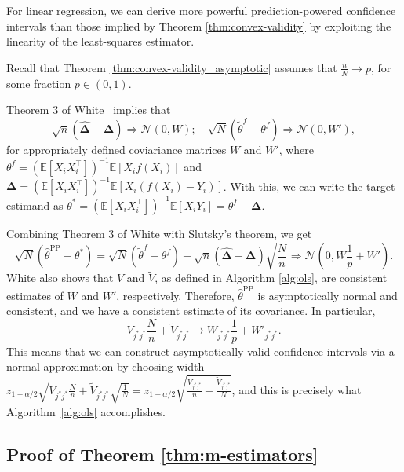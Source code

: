 \documentclass[10pt]{article}
\def\E{\mathbb{E}}
\newcommand{\thetaf}{\tilde{\theta}^{f}}
\newcommand{\thetaflimit}{\theta^f}
\newcommand{\thetaPP}{\hat{\theta}^{\mathrm{PP}}}
\newcommand{\rec}{\mathbf{\Delta}}
\newcommand{\rechat}{\hat{\mathbf{\Delta}}}
\begin{document}
For linear regression, we can derive more powerful prediction-powered confidence intervals than those implied by Theorem \ref{thm:convex-validity} by exploiting the linearity of the least-squares estimator.

Recall that Theorem \ref{thm:convex-validity_asymptotic} assumes that $\frac{n}{N}\rightarrow p$, for some fraction $p\in(0,1)$.

Theorem 3 of White~\cite{white1980heteroskedasticity} implies that
$$\sqrt{n}(\rechat - \rec) \Rightarrow \mathcal{N}(0, W);\quad \sqrt{N}(\thetaf - \thetaflimit) \Rightarrow \mathcal{N}(0, W'),$$
for appropriately defined coviariance matrices $W$ and $W'$, where $\thetaflimit = (\E[X_i X_i^\top])^{-1} \E[X_i f(X_i)]$ and $\rec = (\E[X_i X_i^\top])^{-1} \E[X_i (f(X_i)-Y_i)]$. With this, we can write the target estimand as $\theta^* = (\E[X_i X_i^\top])^{-1} \E[X_i Y_i] = \thetaflimit - \rec$.

Combining Theorem 3 of White with Slutsky's theorem, we get
$$\sqrt{N}(\thetaPP - \theta^*) = \sqrt{N}(\thetaf - \thetaflimit) - \sqrt{n}(\rechat - \rec)\sqrt{\frac{N}{n}} \Rightarrow \mathcal N\left(0, W\frac{1}{p} + W' \right).$$
White also shows that $V$ and $\tilde V$, as defined in Algorithm \ref{alg:ols}, are consistent estimates of $W$ and $W'$, respectively. Therefore, $\thetaPP$ is asymptotically normal and consistent, and we have a consistent estimate of its covariance. In particular,
$$V_{j^*j^*}\frac{N}{n} + \tilde V_{j^*j^*} \rightarrow W_{j^*j^*}\frac{1}{p} + W'_{j^*j^*}.$$
This means that we can construct asymptotically valid confidence intervals via a normal approximation by choosing width $z_{1-\alpha/2}\sqrt{V_{j^*j^*}\frac{N}{n} + \tilde V_{j^*j^*}} \sqrt{\frac{1}{N}} = z_{1-\alpha/2}\sqrt{\frac{V_{j^*j^*}}{n} + \frac{\tilde V_{j^*j^*}}{N}}$, and this is precisely what Algorithm~\ref{alg:ols} accomplishes.





\subsection{Proof of Theorem \ref{thm:m-estimators}}
\end{document}

